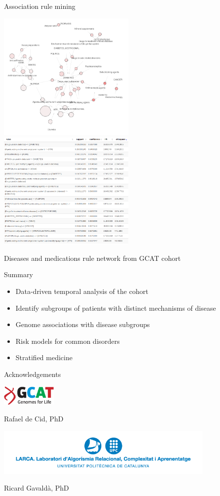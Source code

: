 \documentclass[ignorenonframetext,]{beamer}
\providecommand{\tightlist}{%
\setlength{\itemsep}{0pt}\setlength{\parskip}{0pt}}
\begin{document}
\begin{frame}{Association rule mining}

\includegraphics[keepaspectratio,width=0.5\textwidth]{images/rule_clusters.png}
\includegraphics[keepaspectratio,width=0.5\textwidth]{images/rules.png}

Diseases and medications rule network from GCAT cohort

\end{frame}

\begin{frame}{Summary}

\begin{itemize}
\tightlist
\item
  Data-driven temporal analysis of the cohort
\item
  Identify subgroups of patients with distinct mechanisms of disease
\item
  Genome associations with disease subgroups
\item
  Risk models for common disorders
\item
  Stratified medicine
\end{itemize}

\end{frame}

\begin{frame}{Acknowledgements}

\begin{center}
\includegraphics[keepaspectratio,width=0.2\textwidth]{images/logo-GCAT.png}

Rafael de Cid, PhD

\includegraphics[keepaspectratio,width=0.8\textwidth]{images/larca.png}

Ricard Gavaldà, PhD

\end{center}

\end{frame}
\end{document}
